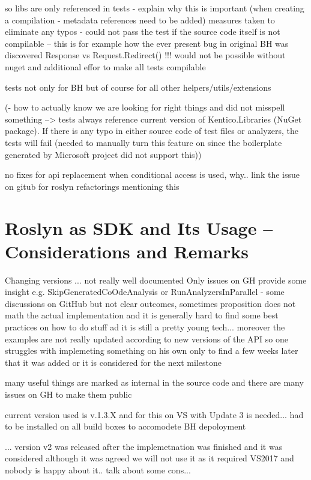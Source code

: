 \documentclass[
  digital, %
  table,   %
  lof,     %
  lot,     %
  oneside,
]{fithesis3}
\begin{document}
so libs are only referenced in tests - explain why this is important (when creating a compilation - metadata references need to be added)
measures taken to eliminate any typos - could not pass the test if the source code itself is not compilable -- this is for example how the ever present bug in original BH was discovered Response vs Request.Redirect() !!! would not be possible without nuget and additional effor to make all tests compilable

tests not only for BH but of course for all other helpers/utils/extensions

(- how to actually know we are looking for right things and did not misspell something --> tests always reference current version of Kentico.Libraries (NuGet package). If there is any typo in either source code of test files or analyzers, the tests will fail (needed to manually turn this feature on since the boilerplate generated by Microsoft project did not support this))

no fixes for api replacement when conditional access is used, why.. link the issue on gitub for roslyn refactorings mentioning this

\section{Roslyn as SDK and Its Usage -- Considerations and Remarks}
Changing versions ... not really well documented
Only issues on GH provide some insight
e.g. SkipGeneratedCoOdeAnalysis or RunAnalyzersInParallel - some discussions on GitHub but not clear outcomes, sometimes proposition does not math the actual implementation and it is generally hard to find some best practices on how to do stuff ad it is still a pretty young tech... moreover the examples are not really updated according to new versions of the API so one struggles with implemeting something on his own only to find a few weeks later that it was added or it is considered for the next milestone

many useful things are marked as internal in the source code and there are many issues on GH to make them public

current version used is v.1.3.X and for this on VS with Update 3 is needed... had to be installed on all build boxes to accomodete BH depoloyment

... version v2 was released after the implemetnation was finished and it was considered although it was agreed we will not use it as it required VS2017 and nobody is happy about it.. talk about some cons...
\end{document}
